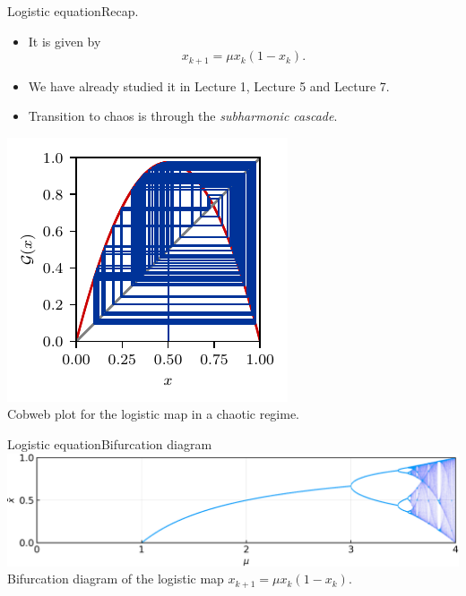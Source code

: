 \documentclass[usenames,dvipsnames,svgnames,10pt,aspectratio=169]{beamer}
\begin{document}
\begin{frame}[t, c]{Logistic equation}{Recap.}
	\begin{minipage}{.48\textwidth}
		\begin{itemize}
			\item It is given by
			$$ x_{k+1} = \mu x_k \left( 1 - x_k \right).$$

			\item We have already studied it in Lecture 1, Lecture 5 and Lecture 7.

			\medskip

			\item Transition to chaos is through the \emph{subharmonic cascade}.
		\end{itemize}
	\end{minipage}%
	\hfill
	\begin{minipage}{.48\textwidth}
		\centering
		\includegraphics[width=.75\columnwidth]{logistic_map_cobweb_plot_9}\\
		Cobweb plot for the logistic map in a chaotic regime.
	\end{minipage}

	\vspace{1cm}
\end{frame}

\begin{frame}[t, c]{Logistic equation}{Bifurcation diagram}
	\centering
	\includegraphics[width=.75\textwidth]{logistic_map_bifurcation_diagram}\\

	Bifurcation diagram of the logistic map $x_{k+1} = \mu x_k \left( 1 - x_k \right)$.
	\vspace{1cm}
\end{frame}
\end{document}
